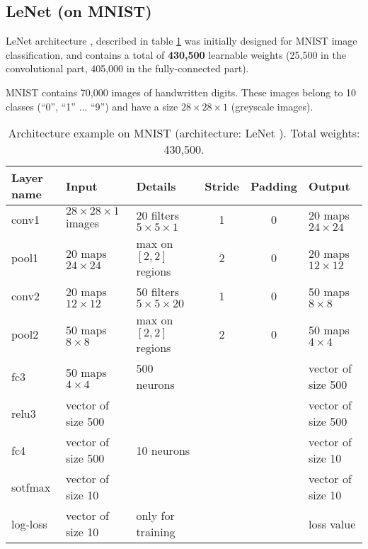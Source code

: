 \subsection{LeNet (on MNIST)}

LeNet architecture \cite{MNIST}, described in table \ref{table:LeNet} was initially designed for MNIST image classification, and contains a total of 
\textbf{430,500} learnable weights (25,500 in the convolutional part, 405,000 in the fully-connected part). 

MNIST contains 70,000 images of handwritten digits. These images belong to 10 classes (``0'', ``1'' ... ``9'') and have a size $28 \times 
28 \times 1$ (greyscale images). 

\begin{table}[h]
\begin{center}
 \begin{tabular}{|l||l||l|c|c||l|}
   \hline
   Layer name  & Input                          & Details                                 & Stride & Padding & Output                 \\
   \hline
   \hline
   conv1       & $28 \times 28 \times 1$ images & 20 filters $5 \times 5 \times 1$        & 1      & 0       & 20 maps $24 \times 24$ \\
   pool1       & 20 maps $24 \times 24$         & max on $[2, 2]$ regions                 & 2      & 0       & 20 maps $12 \times 12$ \\
   \hline
   conv2       & 20 maps $12 \times 12$         & 50 filters $5 \times 5 \times 20$       & 1      & 0       & 50 maps $8 \times 8$   \\
   pool2       & 50 maps $8 \times 8$           & max on $[2, 2]$ regions                 & 2      & 0       & 50 maps $4 \times 4$   \\
   \hline
   fc3         & 50 maps $4 \times 4$           & 500 neurons                             &        &         & vector of size 500     \\
   relu3       & vector of size 500             &                                         &        &         & vector of size 500     \\
   fc4         & vector of size 500             & 10 neurons                              &        &         & vector of size 10      \\
   \hline
   sotfmax     & vector of size 10              &                                         &        &         & vector of size 10      \\
   log-loss    & vector of size 10              & only for training                       &        &         & loss value             \\
   \hline
 \end{tabular}
 \caption{Architecture example on MNIST (architecture: LeNet \cite{MNIST}). Total weights: 430,500.}
 \label{table:LeNet}
\end{center}
\end{table} 




